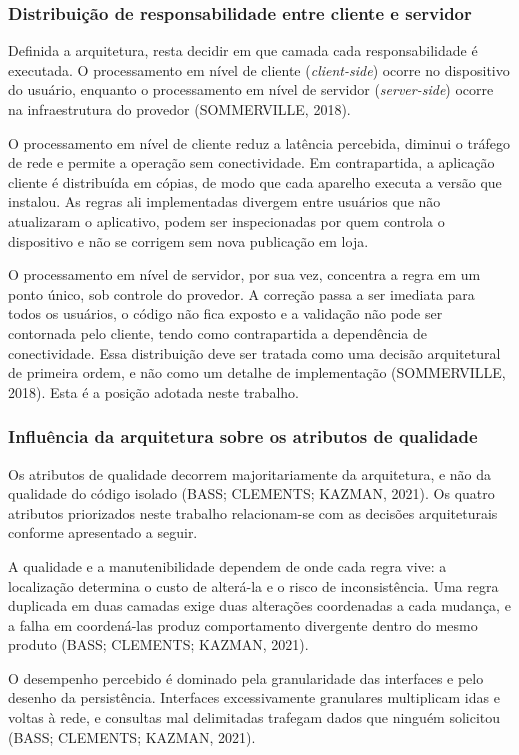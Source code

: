 \documentclass[12pt,oneside,a4paper,brazilian]{abntex2}
\begin{document}
\subsubsection{Distribuição de responsabilidade entre cliente e servidor}
Definida a arquitetura, resta decidir em que camada cada responsabilidade é executada. O processamento em nível de cliente (\textit{client-side}) ocorre no dispositivo do usuário, enquanto o processamento em nível de servidor (\textit{server-side}) ocorre na infraestrutura do provedor (SOMMERVILLE, 2018).

O processamento em nível de cliente reduz a latência percebida, diminui o tráfego de rede e permite a operação sem conectividade. Em contrapartida, a aplicação cliente é distribuída em cópias, de modo que cada aparelho executa a versão que instalou. As regras ali implementadas divergem entre usuários que não atualizaram o aplicativo, podem ser inspecionadas por quem controla o dispositivo e não se corrigem sem nova publicação em loja.

O processamento em nível de servidor, por sua vez, concentra a regra em um ponto único, sob controle do provedor. A correção passa a ser imediata para todos os usuários, o código não fica exposto e a validação não pode ser contornada pelo cliente, tendo como contrapartida a dependência de conectividade. Essa distribuição deve ser tratada como uma decisão arquitetural de primeira ordem, e não como um detalhe de implementação (SOMMERVILLE, 2018). Esta é a posição adotada neste trabalho.


\subsubsection{Influência da arquitetura sobre os atributos de qualidade}
Os atributos de qualidade decorrem majoritariamente da arquitetura, e não da qualidade do código isolado (BASS; CLEMENTS; KAZMAN, 2021). Os quatro atributos priorizados neste trabalho relacionam-se com as decisões arquiteturais conforme apresentado a seguir.

A qualidade e a manutenibilidade dependem de onde cada regra vive: a localização determina o custo de alterá-la e o risco de inconsistência. Uma regra duplicada em duas camadas exige duas alterações coordenadas a cada mudança, e a falha em coordená-las produz comportamento divergente dentro do mesmo produto (BASS; CLEMENTS; KAZMAN, 2021).

O desempenho percebido é dominado pela granularidade das interfaces e pelo desenho da persistência. Interfaces excessivamente granulares multiplicam idas e voltas à rede, e consultas mal delimitadas trafegam dados que ninguém solicitou (BASS; CLEMENTS; KAZMAN, 2021).
\end{document}
